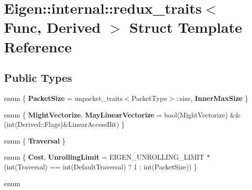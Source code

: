 \hypertarget{struct_eigen_1_1internal_1_1redux__traits}{}\section{Eigen\+:\+:internal\+:\+:redux\+\_\+traits$<$ Func, Derived $>$ Struct Template Reference}
\label{struct_eigen_1_1internal_1_1redux__traits}
\subsection*{Public Types}
\begin{DoxyCompactItemize}
\item 
\mbox{\label{struct_eigen_1_1internal_1_1redux__traits_aeb9eeaa299b9cc5300cc0587d331998c}} 
enum \{ {\bfseries Packet\+Size} = unpacket\+\_\+traits$<$Packet\+Type$>$\+:\+:size, 
{\bfseries Inner\+Max\+Size}
 \}
\item 
\mbox{\label{struct_eigen_1_1internal_1_1redux__traits_adbc8ac948d30d3ce7737bc86dead9bee}} 
enum \{ {\bfseries Might\+Vectorize}, 
{\bfseries May\+Linear\+Vectorize} = bool(Might\+Vectorize) \&\& (int(Derived\+:\+:Flags)\&Linear\+Access\+Bit)
 \}
\item 
\mbox{\label{struct_eigen_1_1internal_1_1redux__traits_a7f345086dce56e46003d485cf216653f}} 
enum \{ {\bfseries Traversal}
 \}
\item 
\mbox{\label{struct_eigen_1_1internal_1_1redux__traits_a1236a03521fba50f104692c7183e1dce}} 
enum \{ {\bfseries Cost}, 
{\bfseries Unrolling\+Limit} = E\+I\+G\+E\+N\+\_\+\+U\+N\+R\+O\+L\+L\+I\+N\+G\+\_\+\+L\+I\+M\+IT $\ast$ (int(Traversal) == int(Default\+Traversal) ? 1 \+: int(Packet\+Size))
 \}
\item 
\mbox{\label{struct_eigen_1_1internal_1_1redux__traits_aaa82d627383026bb11644eb0f51fe550}} 
enum 
\item 
\mbox{\label{struct_eigen_1_1internal_1_1redux__traits_ab142f4eb24ca395e0156f97d5c5666dc}} 

\end{DoxyCompactItemize}
